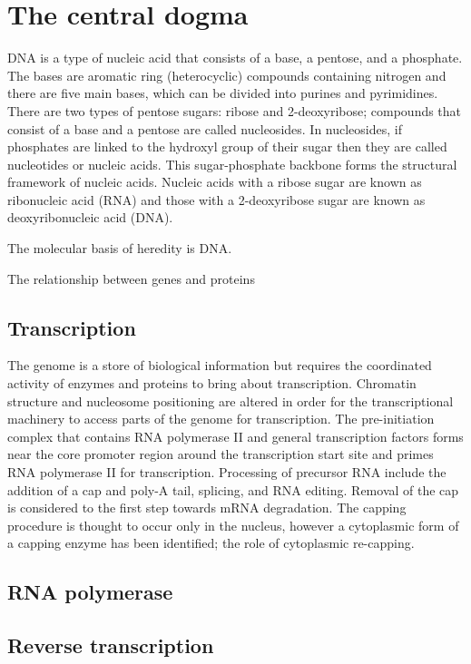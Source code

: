 \section{The central dogma}

DNA is a type of nucleic acid that consists of a base, a pentose, and a phosphate. The bases are aromatic ring (heterocyclic) compounds containing nitrogen and there are five main bases, which can be divided into purines and pyrimidines. There are two types of pentose sugars: ribose and 2-deoxyribose; compounds that consist of a base and a pentose are called nucleosides. In nucleosides, if phosphates are linked to the hydroxyl group of their sugar then they are called nucleotides or nucleic acids. This sugar-phosphate backbone forms the structural framework of nucleic acids. Nucleic acids with a ribose sugar are known as ribonucleic acid (RNA) and those with a 2-deoxyribose sugar are known as deoxyribonucleic acid (DNA).

The molecular basis of heredity is DNA.

The relationship between genes and proteins 

\subsection{Transcription}

The genome is a store of biological information but requires the coordinated activity of enzymes and proteins to bring about transcription. Chromatin structure and nucleosome positioning are altered in order for the transcriptional machinery to access parts of the genome for transcription. The pre-initiation complex that contains RNA polymerase II and general transcription factors forms near the core promoter region around the transcription start site and primes RNA polymerase II for transcription. Processing of precursor RNA include the addition of a cap and poly-A tail, splicing, and RNA editing. Removal of the cap is considered to the first step towards mRNA degradation. The capping procedure is thought to occur only in the nucleus, however a cytoplasmic form of a capping enzyme has been identified; the role of cytoplasmic re-capping.

\subsection{RNA polymerase}

\subsection{Reverse transcription}


